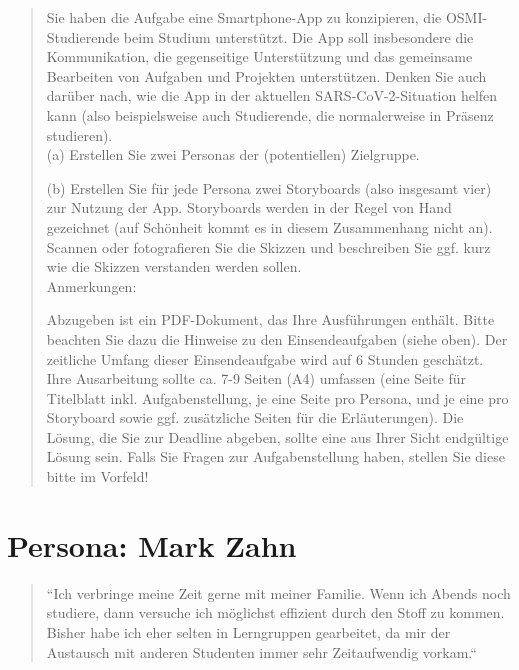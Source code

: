 \documentclass{article}
\begin{document}
\begin{quote}
	Sie haben die Aufgabe eine Smartphone-App zu konzipieren, die OSMI-Studierende beim Studium unterstützt.
	Die App soll insbesondere die Kommunikation, die gegenseitige Unterstützung und das gemeinsame Bearbeiten
	von Aufgaben und Projekten unterstützen. Denken Sie auch darüber nach, wie die App in der aktuellen
	SARS-CoV-2-Situation helfen kann (also beispielsweise auch Studierende, die normalerweise in Präsenz studieren).
	\\[1em]
	(a) Erstellen Sie zwei Personas der (potentiellen) Zielgruppe.

	(b) Erstellen Sie für jede Persona zwei Storyboards (also insgesamt vier) zur Nutzung der App. Storyboards
	werden in der Regel von Hand gezeichnet (auf Schönheit kommt es in diesem Zusammenhang nicht an). Scannen
	oder fotografieren Sie die Skizzen und beschreiben Sie ggf. kurz wie die Skizzen verstanden werden sollen.
	\\[1em]
	Anmerkungen:

	Abzugeben ist ein PDF-Dokument, das Ihre Ausführungen enthält. Bitte beachten Sie dazu die Hinweise zu den
	Einsendeaufgaben (siehe oben). Der zeitliche Umfang dieser Einsendeaufgabe wird auf 6 Stunden geschätzt.
	Ihre Ausarbeitung sollte ca. 7-9 Seiten (A4) umfassen (eine Seite für Titelblatt inkl. Aufgabenstellung,
	je eine Seite pro Persona, und je eine pro Storyboard sowie ggf. zusätzliche Seiten für die Erläuterungen).
	Die Lösung, die Sie zur Deadline abgeben, sollte eine aus Ihrer Sicht endgültige Lösung sein. Falls Sie
	Fragen zur Aufgabenstellung haben, stellen Sie diese bitte im Vorfeld!
\end{quote}

\newpage

\section{Persona: Mark Zahn}

\begin{figure}
	
\end{figure}

\begin{quote}
	\large{``Ich verbringe meine Zeit gerne mit meiner Familie. Wenn ich Abends noch studiere, dann versuche
		ich möglichst effizient durch den Stoff zu kommen. Bisher habe ich eher selten in Lerngruppen gearbeitet,
		da mir der Austausch mit anderen Studenten immer sehr Zeitaufwendig vorkam.``}
\end{quote}
\end{document}
